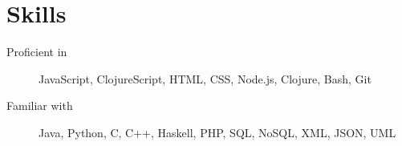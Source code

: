 \section*{Skills}
\begin{description}
  \item[Proficient in] JavaScript, ClojureScript, HTML, CSS, Node.js, Clojure, Bash, Git
  \item[Familiar with] Java, Python, C, C++, Haskell, PHP, SQL, NoSQL, XML, JSON, UML
\end{description}
